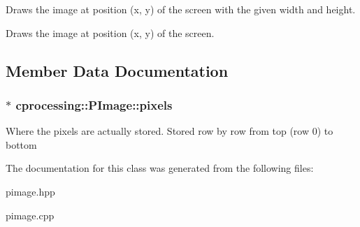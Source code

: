 \-Draws the image at position (x, y) of the screen with the given width and height. 

\-Draws the image at position (x, y) of the screen. 

\subsection{\-Member \-Data \-Documentation}
\hypertarget{classcprocessing_1_1PImage_a6c411ebe0b1bb92e0e17a3e5ffaf7bf0}{
\subsubsection[{pixels}]{$\ast$ {\bf cprocessing\-::\-P\-Image\-::pixels}}}\label{classcprocessing_1_1PImage_a6c411ebe0b1bb92e0e17a3e5ffaf7bf0}
\-Where the pixels are actually stored. \-Stored row by row from top (row 0) to bottom 

\-The documentation for this class was generated from the following files\-:\begin{DoxyCompactItemize}
\item 
pimage.\-hpp\item 
pimage.\-cpp\end{DoxyCompactItemize}

